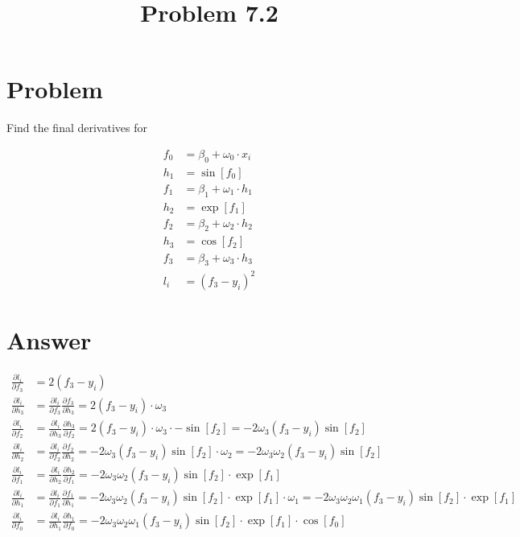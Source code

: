 \documentclass{article}
\title{Problem 7.2}
\begin{document}
\maketitle

\section{Problem}

Find the final derivatives for

\begin{align*}
    f_{0} &= \beta_{0} + \omega_{0} \cdot x_{i} \\
    h_{1} &= \sin[f_{0}] \\
    f_{1} &= \beta_{1} + \omega_{1} \cdot h_{1} \\
    h_{2} &= \exp[f_{1}] \\
    f_{2} &= \beta_{2} + \omega_{2} \cdot h_{2} \\
    h_{3} &= \cos[f_{2}] \\
    f_{3} &= \beta_{3} + \omega_{3} \cdot h_{3} \\
    l_{i} &= (f_{3}- y_{i})^2
\end{align*}

\section{Answer}

\begin{align*}
\frac{\partial{l_{i}}}{\partial{f_{3}}} &= 2(f_{3}- y_{i}) \\
\frac{\partial{l_{i}}}{\partial{h_{3}}} &= \frac{\partial{l_{i}}}{\partial{f_{3}}} \frac{\partial{f_{3}}}{\partial{h_{3}}} = 2(f_{3}- y_{i}) \cdot \omega_{3} \\
\frac{\partial{l_{i}}}{\partial{f_{2}}} &= \frac{\partial{l_{i}}}{\partial{h_{3}}} \frac{\partial{h_{3}}}{\partial{f_{2}}} = 2(f_{3}- y_{i}) \cdot \omega_{3} \cdot - \sin[f_{2}] = - 2 \omega_{3} (f_{3}- y_{i}) \sin[f_{2}] \\
\frac{\partial{l_{i}}}{\partial{h_{2}}} &= \frac{\partial{l_{i}}}{\partial{f_{2}}} \frac{\partial{f_{2}}}{\partial{h_{2}}} = - 2 \omega_{3} (f_{3}- y_{i}) \sin[f_{2}] \cdot \omega_{2} = - 2 \omega_{3} \omega_{2} (f_{3}- y_{i}) \sin[f_{2}] \\
\frac{\partial{l_{i}}}{\partial{f_{1}}} &= \frac{\partial{l_{i}}}{\partial{h_{2}}} \frac{\partial{h_{2}}}{\partial{f_{1}}} = - 2 \omega_{3} \omega_{2} (f_{3}- y_{i}) \sin[f_{2}] \cdot \exp[f_{1}] \\
\frac{\partial{l_{i}}}{\partial{h_{1}}} &= \frac{\partial{l_{i}}}{\partial{f_{1}}} \frac{\partial{f_{1}}}{\partial{h_{1}}} = - 2 \omega_{3} \omega_{2} (f_{3}- y_{i}) \sin[f_{2}] \cdot \exp[f_{1}] \cdot \omega_{1} = - 2 \omega_{3} \omega_{2} \omega_{1} (f_{3}- y_{i}) \sin[f_{2}] \cdot \exp[f_{1}] \\
\frac{\partial{l_{i}}}{\partial{f_{0}}} &= \frac{\partial{l_{i}}}{\partial{h_{1}}} \frac{\partial{h_{1}}}{\partial{f_{0}}} = - 2 \omega_{3} \omega_{2} \omega_{1} (f_{3}- y_{i}) \sin[f_{2}] \cdot \exp[f_{1}] \cdot \cos[f_{0}]
\end{align*}
\end{document}

